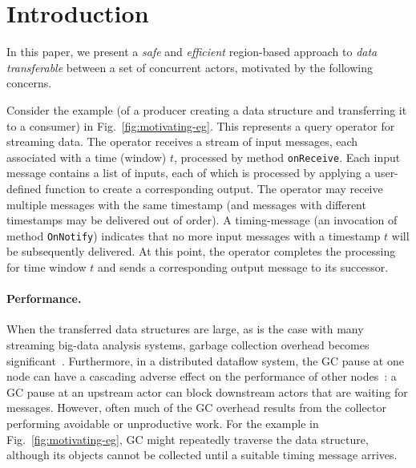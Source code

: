 \newcommand{\TODO}[1]{\textbf{TODO: #1}} \newcommand{\eg}{\emph{e.g.}}
\newcommand{\ie}{\emph{i.e.}}

\section{Introduction} \label{sec:introduction}

In this paper, we present a \emph{safe} and \emph{efficient} region-based approach
to \emph{data transferable} between a set of concurrent actors, motivated by the following concerns.

Consider the example (of  a producer creating a data structure and transferring it to a consumer)
in Fig.~\ref{fig:motivating-eg}. This represents a  query operator for streaming data. 
The operator receives a stream of input messages, each
associated with a time (window) $t$, processed by method
\texttt{onReceive}.  Each input message contains a list of inputs,
each of which is processed by applying a user-defined function to
create a corresponding output.  The operator may receive multiple
messages with the same timestamp (and messages with different
timestamps may be delivered out of order). A timing-message (an
invocation of method \texttt{OnNotify}) indicates that no more input
messages with a timestamp $t$ will be subsequently delivered.  At this
point, the operator completes the processing for time window $t$ and
sends a corresponding output message to its successor.




\paragraph{Performance.}
When the transferred data structures are large, as is the case with many streaming big-data
analysis systems, garbage collection overhead becomes
significant~\cite{Broom:HotOS}.  Furthermore, in a distributed
dataflow system, the GC pause at one node can have a cascading adverse
effect on the performance of other nodes~\cite{Broom:HotOS,harris15}:
a GC pause at an upstream actor can block downstream actors that are waiting for
messages.  However, often much of the GC overhead results from the
collector performing avoidable or unproductive work.  For the example
in Fig.~\ref{fig:motivating-eg}, GC might repeatedly traverse the
 data structure, although its objects cannot be collected until a
suitable timing message arrives.


